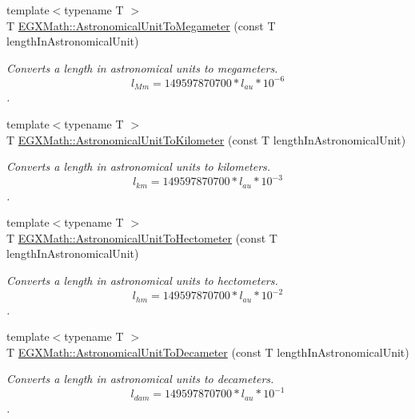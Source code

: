 \begin{DoxyCompactItemize}
{\footnotesize template$<$typename T $>$ }\\T \mbox{\hyperlink{group___e_g_x_math-_conversions-_length_conversions-_astronomical-_astronomical_unit-_s_i_ga0b4cbc4fcc40a26497debeba1f4049cd}{E\+G\+X\+Math\+::\+Astronomical\+Unit\+To\+Megameter}} (const T length\+In\+Astronomical\+Unit)
\begin{DoxyCompactList}\small\item\em Converts a length in astronomical units to megameters. \[ l_{Mm}=149597870700 * l_{au} * 10^{-6} \]. \end{DoxyCompactList}\item 
{\footnotesize template$<$typename T $>$ }\\T \mbox{\hyperlink{group___e_g_x_math-_conversions-_length_conversions-_astronomical-_astronomical_unit-_s_i_ga54770b9bf59a390a3f60ab04064c4198}{E\+G\+X\+Math\+::\+Astronomical\+Unit\+To\+Kilometer}} (const T length\+In\+Astronomical\+Unit)
\begin{DoxyCompactList}\small\item\em Converts a length in astronomical units to kilometers. \[ l_{km}=149597870700 * l_{au} * 10^{-3} \]. \end{DoxyCompactList}\item 
{\footnotesize template$<$typename T $>$ }\\T \mbox{\hyperlink{group___e_g_x_math-_conversions-_length_conversions-_astronomical-_astronomical_unit-_s_i_gab57dd2b64ec8d8e484741dd2459222c7}{E\+G\+X\+Math\+::\+Astronomical\+Unit\+To\+Hectometer}} (const T length\+In\+Astronomical\+Unit)
\begin{DoxyCompactList}\small\item\em Converts a length in astronomical units to hectometers. \[ l_{hm}=149597870700 * l_{au} * 10^{-2} \]. \end{DoxyCompactList}\item 
{\footnotesize template$<$typename T $>$ }\\T \mbox{\hyperlink{group___e_g_x_math-_conversions-_length_conversions-_astronomical-_astronomical_unit-_s_i_gac8f9ac32051072ffda0b6e832c33cc7f}{E\+G\+X\+Math\+::\+Astronomical\+Unit\+To\+Decameter}} (const T length\+In\+Astronomical\+Unit)
\begin{DoxyCompactList}\small\item\em Converts a length in astronomical units to decameters. \[ l_{dam}=149597870700 * l_{au} * 10^{-1} \]. \end{DoxyCompactList}\item 

\end{DoxyCompactItemize}
